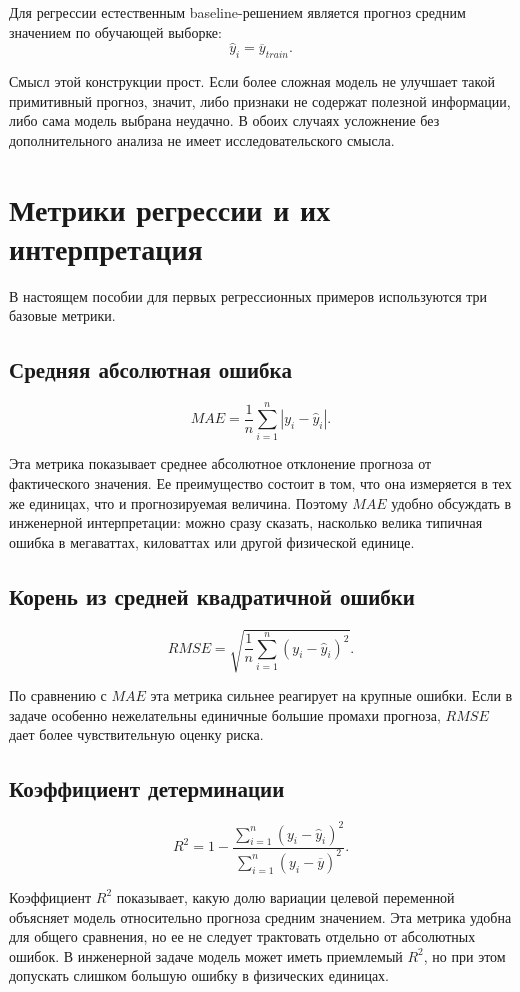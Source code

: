 Для регрессии естественным baseline-решением является прогноз средним значением по обучающей выборке:
\[
\hat{y}_i = \overline{y}_{train}.
\]

Смысл этой конструкции прост. Если более сложная модель не улучшает такой примитивный прогноз, значит, либо признаки не содержат полезной информации, либо сама модель выбрана неудачно. В обоих случаях усложнение без дополнительного анализа не имеет исследовательского смысла.

\section{Метрики регрессии и их интерпретация}

В настоящем пособии для первых регрессионных примеров используются три базовые метрики.

\subsection*{Средняя абсолютная ошибка}

\[
MAE = \frac{1}{n}\sum_{i=1}^{n} |y_i - \hat{y}_i|.
\]

Эта метрика показывает среднее абсолютное отклонение прогноза от фактического значения. Ее преимущество состоит в том, что она измеряется в тех же единицах, что и прогнозируемая величина. Поэтому \(MAE\) удобно обсуждать в инженерной интерпретации: можно сразу сказать, насколько велика типичная ошибка в мегаваттах, киловаттах или другой физической единице.

\subsection*{Корень из средней квадратичной ошибки}

\[
RMSE = \sqrt{\frac{1}{n}\sum_{i=1}^{n}(y_i - \hat{y}_i)^2}.
\]

По сравнению с \(MAE\) эта метрика сильнее реагирует на крупные ошибки. Если в задаче особенно нежелательны единичные большие промахи прогноза, \(RMSE\) дает более чувствительную оценку риска.

\subsection*{Коэффициент детерминации}

\[
R^2 = 1 - \frac{\sum_{i=1}^{n}(y_i - \hat{y}_i)^2}{\sum_{i=1}^{n}(y_i - \overline{y})^2}.
\]

Коэффициент \(R^2\) показывает, какую долю вариации целевой переменной объясняет модель относительно прогноза средним значением. Эта метрика удобна для общего сравнения, но ее не следует трактовать отдельно от абсолютных ошибок. В инженерной задаче модель может иметь приемлемый \(R^2\), но при этом допускать слишком большую ошибку в физических единицах.

